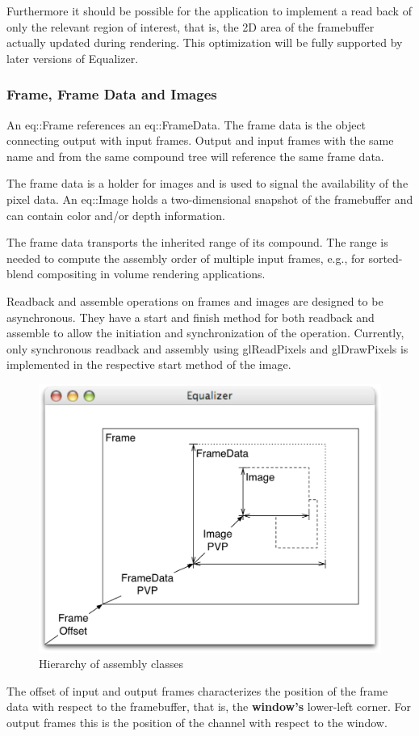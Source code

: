 \documentclass[10pt,a4]{scrartcl}
\begin{document}
Furthermore it should be possible for the application to implement a
read back of only the relevant region of interest, that is, the 2D area
of the framebuffer actually updated during rendering. This optimization
will be fully supported by later versions of Equalizer.

\subsubsection{Frame, Frame Data and Images}

An \textsf{eq::Frame} references an \textsf{eq::Fra\-me\-Data}. The
frame data is the object connecting output with input frames. Output and
input frames with the same name and from the same compound tree will
reference the same frame data.

The frame data is a holder for images and is used to signal the
availability of the pixel data. An \textsf{eq::Image} holds a
two-dimensional snapshot of the framebuffer and can contain color and/or
depth information.

The frame data transports the inherited range of its compound. The range
is needed to compute the assembly order of multiple input frames, e.g.,
for sorted-blend compositing in volume rendering applications.

Readback and assemble operations on frames and images are designed to be
asynchronous. They have a start and finish method for both readback and
assemble to allow the initiation and synchronization of the operation.
Currently, only synchronous readback and assembly using
\textsf{glReadPixels} and \textsf{glDrawPixels} is implemented in the
respective start method of the image.

\begin{figure}
  \includegraphics[width=.6\textwidth]{images/assembly.pdf}
  {\caption{\small\label{fAssembly}Hierarchy of assembly classes}}
\end{figure}
The offset of input and output frames characterizes the position of the
frame data with respect to the framebuffer, that is, the
\textbf{window's} lower-left corner. For output frames this is the
position of the channel with respect to the window.
\end{document}
